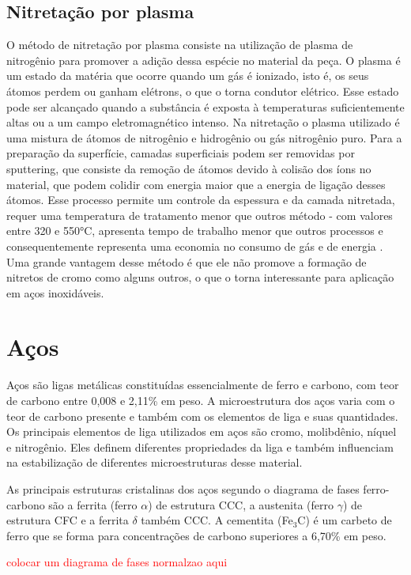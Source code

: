 \documentclass[]{politex}
\newcommand\myworries[1]{\textcolor{red}{#1}}
\begin{document}
\subsection{Nitretação por plasma}
	O método de nitretação por plasma consiste na utilização de plasma de nitrogênio para promover a adição dessa espécie no material da peça. 
	O plasma é um estado da matéria que ocorre quando um gás é ionizado, isto é, os seus átomos perdem ou ganham elétrons, o que o torna condutor elétrico. Esse estado pode ser alcançado quando a substância é exposta à temperaturas suficientemente altas ou a um campo eletromagnético intenso. Na nitretação o plasma utilizado é uma mistura de átomos de nitrogênio e hidrogênio ou gás nitrogênio puro.
	Para a preparação da superfície, camadas superficiais podem ser removidas por sputtering, que consiste da remoção de átomos devido à colisão dos íons no material, que podem colidir com energia maior que a energia de ligação desses átomos.
	 Esse processo permite um controle da espessura e da camada nitretada, requer uma temperatura de tratamento menor que outros método - com valores entre 320 e 550°C, apresenta tempo de trabalho menor que outros processos e consequentemente representa uma economia no consumo de gás e de energia \cite{zimmermannnitretaccao}. 
	Uma grande vantagem desse método é que ele não promove a formação de nitretos de cromo como alguns outros, o que o torna interessante para aplicação em aços inoxidáveis.
	
\section{Aços}
	Aços são ligas metálicas constituídas essencialmente de ferro e carbono, com teor de carbono entre 0,008 e 2,11\% em peso. A microestrutura dos aços varia com o teor de carbono presente e também com os elementos de liga e suas quantidades. Os principais elementos de liga utilizados em aços são cromo, molibdênio, níquel e nitrogênio. Eles definem diferentes propriedades da liga e também influenciam na estabilização de diferentes microestruturas desse material. \par
	As principais estruturas cristalinas dos aços segundo o diagrama de fases ferro-carbono são a ferrita (ferro $\alpha$) de estrutura CCC, a austenita (ferro $\gamma$) de estrutura CFC e a ferrita $\delta$ também CCC. A cementita (Fe$_{3}$C) é um carbeto de ferro que se forma para concentrações de carbono superiores a 6,70\% em peso.
	
\myworries{colocar um diagrama de fases normalzao aqui}
\end{document}
